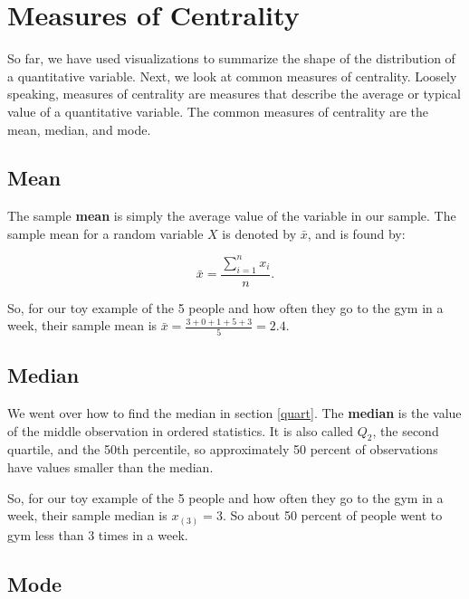 \documentclass[
]{book}
\begin{document}
\hypertarget{measures-of-centrality}{%
\section{Measures of Centrality}\label{measures-of-centrality}}

So far, we have used visualizations to summarize the shape of the distribution of a quantitative variable. Next, we look at common measures of centrality. Loosely speaking, measures of centrality are measures that describe the average or typical value of a quantitative variable. The common measures of centrality are the mean, median, and mode.

\hypertarget{mean}{%
\subsection{Mean}\label{mean}}

The sample \textbf{mean} is simply the average value of the variable in our sample. The sample mean for a random variable \(X\) is denoted by \(\bar{x}\), and is found by:

\begin{equation} 
\bar{x} = \frac{\sum_{i=1}^n x_i}{n}.
\label{eq:mean}
\end{equation}

So, for our toy example of the 5 people and how often they go to the gym in a week, their sample mean is \(\bar{x} = \frac{3+0+1+5+3}{5} = 2.4\).

\hypertarget{median}{%
\subsection{Median}\label{median}}

We went over how to find the median in section \ref{quart}. The \textbf{median} is the value of the middle observation in ordered statistics. It is also called \(Q_2\), the second quartile, and the 50th percentile, so approximately 50 percent of observations have values smaller than the median.

So, for our toy example of the 5 people and how often they go to the gym in a week, their sample median is \(x_{(3)} = 3\). So about 50 percent of people went to gym less than 3 times in a week.

\hypertarget{mode}{%
\subsection{Mode}\label{mode}}
\end{document}
